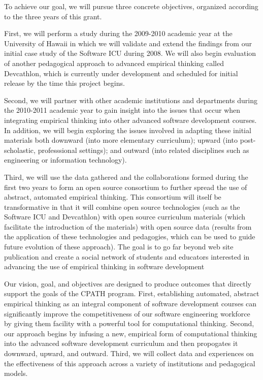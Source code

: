 To achieve our goal, we will pursue three concrete objectives, organized
according to the three years of this grant.  

First, we will perform a study during the 2009-2010 academic year at the University of Hawaii in which we will validate and extend the findings from our initial case study of the Software ICU during 2008.  We will also begin evaluation of another pedagogical approach to advanced empirical thinking called Devcathlon, which is currently under development and scheduled for initial release by the time this project begins.

Second, we will partner with other academic institutions and departments
during the 2010-2011 academic year to gain insight into the issues that
occur when integrating empirical thinking into other advanced software
development courses.  In addition, we will begin exploring the issues
involved in adapting these initial materials both downward (into more
elementary curriculum); upward (into post-scholastic, professsional
settings); and outward (into related disciplines such as engineering or
information technology).

Third, we will use the data gathered and the collaborations formed during
the first two years to form an open source consortium to further spread the
use of abstract, automated empirical thinking.  This consortium will itself
be transformative in that it will combine open source technologies (such as
the Software ICU and Devcathlon) with open source curriculum materials
(which facilitate the introduction of the materials) with open source data
(results from the application of these technologies and pedagogies, which
can be used to guide future evolution of these approach).  The goal is to
go far beyond web site publication and create a social network of students
and educators interested in advancing the use of empirical thinking in
software development

Our vision, goal, and objectives are designed to produce outcomes that
directly support the goals of the CPATH program.  First, establishing
automated, abstract empirical thinking as an integral component of software
development courses can significantly improve the competitiveness of our
software engineering workforce by giving them facility with a powerful tool
for computational thinking.  Second, our approach begins by infusing a new,
empirical form of computational thinking into the advanced software
development curriculum and then propogates it downward, upward, and
outward.  Third, we will collect data and experiences on the effectiveness
of this approach across a variety of institutions and pedagogical models.

